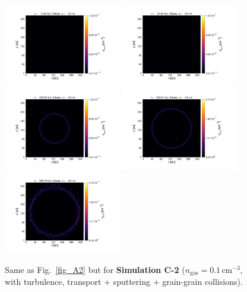 \documentclass[fleqn,usenatbib]{mnras}
\begin{document}
\begin{figure}
  \includegraphics[trim=2.8cm 1.5cm 9.3cm 2.0cm, clip=true,page=4,height = 3.6cm]{Pics/Pics_C2/Density_1_00041.pdf}\hspace*{-0.05cm} 
 \includegraphics[trim=5.2cm 1.5cm 9.3cm 2.0cm, clip=true,page=4,height = 3.6cm]{Pics/Pics_C2/Density_1_00201.pdf}\hspace*{-0.05cm} 
 \includegraphics[trim=5.2cm 1.5cm 9.3cm 2.0cm, clip=true,page=4,height = 3.6cm]{Pics/Pics_C2/Density_1_00801.pdf}\hspace*{-0.05cm}  
 \includegraphics[trim=5.2cm 1.5cm 9.3cm 2.0cm, clip=true,page=4,height = 3.6cm]{Pics/Pics_C2/Density_1_02001.pdf}\hspace*{-0.05cm} 
 \includegraphics[trim=5.2cm 1.5cm 3.2cm 2.0cm, clip=true,page=4,height = 3.6cm]{Pics/Pics_C2/Density_1_04000.pdf}\\
  \caption{Same as Fig.~\ref{fig_A2} but for \textbf{Simulation C-2} ($n_\text{gas}=0.1\,\text{cm}^{-3}$, with turbulence, transport + sputtering + grain-grain collisions).}
   \label{fig_C2} 
  \end{figure}  
  
\end{document}
